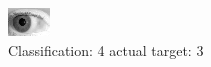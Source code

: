 \begin{figure}[h!]
\begin{center}
\includegraphics[width=0.60\columnwidth]{figures/ID243_class_4_target_3.png}
\end{center}
\caption{ Classification: 4 actual target: 3}
\label{fig:ID243_class_4_target_3}
\end{figure}
